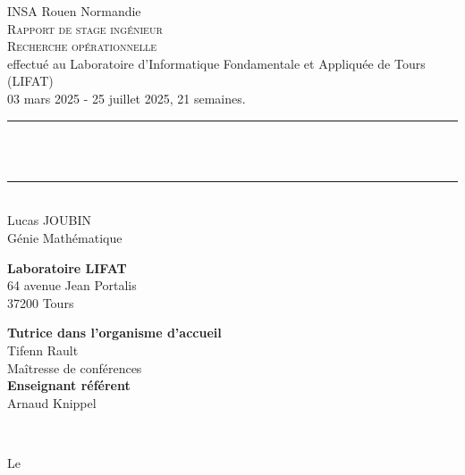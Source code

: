 \begin{titlepage}
    \begin{center}
        {\Large INSA Rouen Normandie}\\[1. cm]
        \textsc{\LARGE Rapport de stage ingénieur}\\
        \textsc{\Large Recherche opérationnelle}
    \\[1. cm]
    \large effectué au Laboratoire d'Informatique Fondamentale et Appliquée de Tours (LIFAT) \\[.5 cm]
    03 mars 2025 - 25 juillet 2025, 21 semaines.\\[1 cm]
	\rule{\linewidth}{0.2 mm} \\[1 cm]
	{ \huge \bfseries \thetitle}\\[.7 cm]
	\rule{\linewidth}{0.2 mm} \\[1 cm]
    	{\Large Lucas JOUBIN}\\[.2 cm]
    	{\large Génie Mathématique}\\[1 cm]
    \end{center}
	\begin{minipage}{0.5\textwidth}
		\begin{flushleft} \large
		  \textbf{Laboratoire LIFAT}\\
		  64 avenue Jean Portalis\\
            37200 Tours\\
		\end{flushleft}
	\end{minipage}
	\begin{minipage}{0.5\textwidth}
        \begin{flushright} \large
			\textbf{Tutrice dans l'organisme d'accueil} \\
			Tifenn Rault\\
            Maîtresse de conférences \\
            \textbf{Enseignant référent} \\
			Arnaud Knippel\\
		\end{flushright}
	\end{minipage}\\[2 cm]
	\begin{center} Le \thedate
	\end{center}
\end{titlepage}
